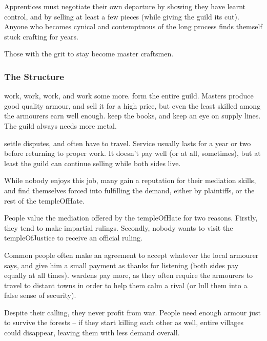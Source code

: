 \begin{multicols}{2}
Apprentices must negotiate their own departure by showing they have learnt control, and by selling at least a few pieces (while giving the guild its cut).
Anyone who becomes cynical and contemptuous of the long process finds themself stuck crafting for years.

Those with the grit to stay become master craftsmen.

\subsubsection{The Structure}

\begin{description}
  work, work, work, and work some more.
  form the entire guild.
  Masters produce good quality armour, and sell it for a high price, but even the least skilled among the armourers earn well enough.
  keep the books, and keep an eye on supply lines.
  The guild always needs more metal.
  \item[\Glspl{proctor}]
  settle disputes, and often have to travel.
  Service usually lasts for a year or two before returning to proper work.
  It doesn't pay well (or at all, sometimes), but at least the guild can continue selling while both sides live.

  While nobody enjoys this job, many gain a reputation for their mediation skills, and find themselves forced into fulfilling the demand, either by plaintiffs, or the rest of the \gls{templeOfHate}.
\end{description}

\noindent
People value the mediation offered by the \gls{templeOfHate} for two reasons.
Firstly, they tend to make impartial rulings.
Secondly, nobody wants to visit the \gls{templeOfJustice} to receive an official ruling.

Common people often make an agreement to accept whatever the local armourer says, and give him a small payment as thanks for listening (both sides pay equally at all times).
\Glspl{warden} pay more, as they often require the armourers to travel to distant towns in order to help them calm a rival (or lull them into a false sense of security).

Despite their calling, they never profit from war.
People need enough armour just to survive the forests -- if they start killing each other as well, entire \glspl{village} could disappear, leaving them with less demand overall.


\end{multicols}
